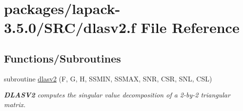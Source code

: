 \hypertarget{dlasv2_8f}{}\section{packages/lapack-\/3.5.0/\+S\+R\+C/dlasv2.f File Reference}
\label{dlasv2_8f}
\subsection*{Functions/\+Subroutines}
\begin{DoxyCompactItemize}
\item 
subroutine \hyperlink{group__auxOTHERauxiliary_gaee8e05a707783a9fba5d213093453543}{dlasv2} (F, G, H, S\+S\+M\+I\+N, S\+S\+M\+A\+X, S\+N\+R, C\+S\+R, S\+N\+L, C\+S\+L)
\begin{DoxyCompactList}\small\item\em {\bfseries D\+L\+A\+S\+V2} computes the singular value decomposition of a 2-\/by-\/2 triangular matrix. \end{DoxyCompactList}\end{DoxyCompactItemize}

